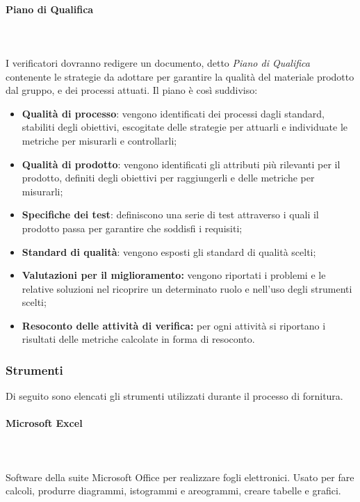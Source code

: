 \paragraph{Piano di Qualifica} \mbox{}\\ \mbox{}\\
I verificatori dovranno redigere un documento, detto \textit{Piano di 
Qualifica} contenente le strategie da adottare per garantire la qualità del 
materiale prodotto dal gruppo, e dei processi attuati. Il piano è così 
suddiviso:
	\begin{itemize}
		\item \textbf{Qualità di processo}: vengono identificati dei processi dagli 
			standard, stabiliti degli obiettivi, escogitate delle strategie per attuarli e 			
			individuate le metriche per misurarli e controllarli;
		\item \textbf{Qualità di prodotto}: vengono identificati gli attributi più 
			rilevanti per il prodotto, definiti degli obiettivi per raggiungerli e delle 
			metriche per misurarli;
		\item \textbf{Specifiche dei test}: definiscono una serie di test attraverso 
			i quali il prodotto passa per garantire che soddisfi i requisiti;
		\item \textbf{Standard di qualità}: vengono esposti gli standard di qualità 
			scelti;
		\item \textbf{Valutazioni per il miglioramento:} vengono riportati i problemi 
			e le relative soluzioni nel ricoprire un determinato ruolo e nell'uso degli 
			strumenti scelti;
		\item \textbf{Resoconto delle attività di verifica:} per ogni attività si 
			riportano i risultati delle metriche calcolate in forma di resoconto.
	\end{itemize}
		
\subsubsection{Strumenti}
Di seguito sono elencati gli strumenti utilizzati durante il processo di 
fornitura.

\paragraph{Microsoft Excel} \mbox{}\\ \mbox{}\\
Software della suite Microsoft Office per realizzare fogli elettronici. Usato 
per fare calcoli, produrre diagrammi, istogrammi e areogrammi, creare tabelle e 
grafici.
		
